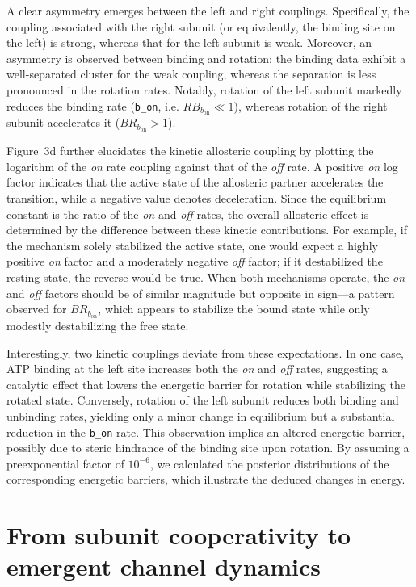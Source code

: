 \documentclass[pdflatex,sn-mathphys-num]{sn-jnl}%
\theoremstyle{thmstyleone}%
\theoremstyle{thmstyletwo}%
\theoremstyle{thmstylethree}%
\begin{document}
A clear asymmetry emerges between the left and right couplings. Specifically, the coupling associated with the right subunit (or equivalently, the binding site on the left) is strong, whereas that for the left subunit is weak. Moreover, an asymmetry is observed between binding and rotation: the binding data exhibit a well-separated cluster for the weak coupling, whereas the separation is less pronounced in the rotation rates. Notably, rotation of the left subunit markedly reduces the binding rate (\texttt{b\_on}, i.e. $RB_{b_{\text{on}}} \ll 1$), whereas rotation of the right subunit accelerates it ($BR_{b_{\text{on}}} > 1$).

Figure~3d further elucidates the kinetic allosteric coupling by plotting the logarithm of the \textit{on} rate coupling against that of the \textit{off} rate. A positive \textit{on} log factor indicates that the active state of the allosteric partner accelerates the transition, while a negative value denotes deceleration. Since the equilibrium constant is the ratio of the \textit{on} and \textit{off} rates, the overall allosteric effect is determined by the difference between these kinetic contributions. For example, if the mechanism solely stabilized the active state, one would expect a highly positive \textit{on} factor and a moderately negative \textit{off} factor; if it destabilized the resting state, the reverse would be true. When both mechanisms operate, the \textit{on} and \textit{off} factors should be of similar magnitude but opposite in sign—a pattern observed for $BR_{b_{\text{on}}}$, which appears to stabilize the bound state while only modestly destabilizing the free state.

Interestingly, two kinetic couplings deviate from these expectations. In one case, ATP binding at the left site increases both the \textit{on} and \textit{off} rates, suggesting a catalytic effect that lowers the energetic barrier for rotation while stabilizing the rotated state. Conversely, rotation of the left subunit reduces both binding and unbinding rates, yielding only a minor change in equilibrium but a substantial reduction in the \texttt{b\_on} rate. This observation implies an altered energetic barrier, possibly due to steric hindrance of the binding site upon rotation. By assuming a preexponential factor of $10^{-6}$, we calculated the posterior distributions of the corresponding energetic barriers, which illustrate the deduced changes in energy.


\section{From subunit cooperativity to emergent channel dynamics}
\label{sec:collective}
\end{document}
